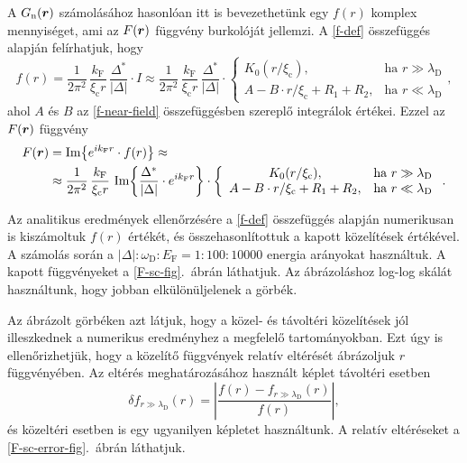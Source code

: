 \documentclass[a4paper,12pt,titlepage]{article}
\newcommand{\RR}{{\vb*{r}}}
\newcommand{\kF}{{k_\text{F}}}
\newcommand{\EF}{{E_\text{F}}}
\begin{document}
A $G_\text{n}(\RR)$ számolásához hasonlóan itt is bevezethetünk egy $f(r)$ komplex mennyiséget, ami az $F(\RR)$ függvény burkolóját jellemzi.  A \eqref{f-def} összefüggés alapján felírhatjuk, hogy
\begin{equation}
	f(r) = \frac{1}{2 \pi^2} \, \frac{\kF}{\xi_\text{c} r} \, \frac{\Delta^*}{\left| \Delta \right|} \cdot I \approx \frac{1}{2 \pi^2} \, \frac{\kF}{\xi_\text{c} r} \, \frac{\Delta^*}{\left| \Delta \right|} \cdot \left\{ \begin{array}{cl}
		K_0(r / \xi_\text{c}), & \text{ha } r \gg \lambda_\text{D} \\
		A - B \cdot r / \xi_\text{c} + R_1 + R_2, & \text{ha } r \ll \lambda_\text{D}
	\end{array} \right. ,
\end{equation}
ahol $A$ és $B$ az \eqref{f-near-field} összefüggésben szereplő integrálok értékei.  Ezzel az $F(\RR)$ függvény
\begin{equation}
\begin{split}
	F(\RR) & = \Im{e^{i \kF r} \cdot f(r)} \approx \\
	& \approx \frac{1}{2 \pi^2} \, \frac{\kF}{\xi_\text{c} r} \, \Im{\frac{\Delta^*}{\left| \Delta \right|} \cdot e^{i \kF r}} \cdot \left\{ \begin{array}{cl}
		K_0(r / \xi_\text{c}), & \text{ha } r \gg \lambda_\text{D} \\
		A - B \cdot r / \xi_\text{c} + R_1 + R_2, & \text{ha } r \ll \lambda_\text{D}
	\end{array} \right. .
\end{split}
\end{equation}

Az analitikus eredmények ellenőrzésére a \eqref{f-def} összefüggés alapján numerikusan is kiszámoltuk $f(r)$ értékét, és összehasonlítottuk a kapott közelítések értékével.  A számolás során a $\left| \Delta \right| : \omega_\text{D} : \EF = 1 : 100 : 10000$ energia arányokat használtuk.  A kapott függvényeket a \ref{F-sc-fig}.\ ábrán láthatjuk.  Az ábrázoláshoz log-log skálát használtunk, hogy jobban elkülönüljelenek a görbék.

Az ábrázolt görbéken azt látjuk, hogy a közel- és távoltéri közelítések jól illeszkednek a numerikus eredményhez a megfelelő tartományokban.  Ezt úgy is ellenőrizhetjük, hogy a közelítő függvények relatív eltérését ábrázoljuk $r$ függvényében.  Az eltérés meghatározásához használt képlet távoltéri esetben
$$ \delta f_{r \gg \lambda_\text{D}}(r) = \left| \frac{f(r) - f_{r \gg \lambda_\text{D}}(r)}{f(r)} \right|, $$
és közeltéri esetben is egy ugyanilyen képletet használtunk.  A relatív eltéréseket a \ref{F-sc-error-fig}.\ ábrán láthatjuk.
\end{document}
